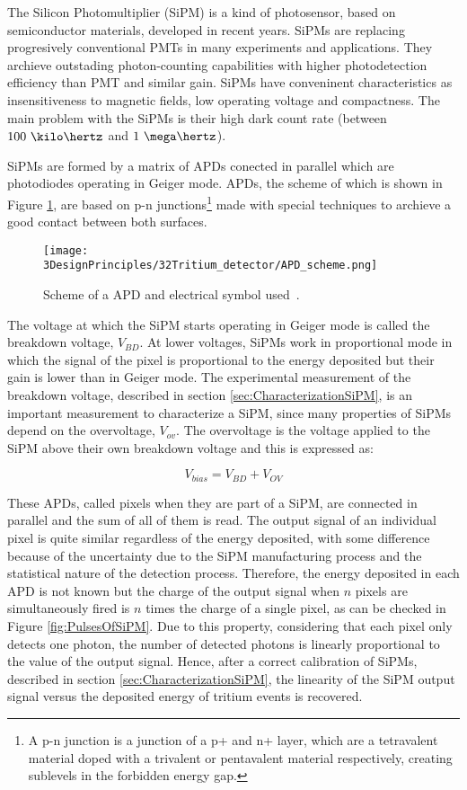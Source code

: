 The Silicon Photomultiplier (SiPM) is a kind of photosensor, based on semiconductor materials, developed in recent years. SiPMs are replacing progresively conventional PMTs in many experiments and applications. They archieve outstading photon-counting capabilities with higher photodetection efficiency than PMT and similar gain. SiPMs have conveninent characteristics as insensitiveness to magnetic fields, low operating voltage and compactness. The main problem with the SiPMs is their high dark count rate (between $100~\kilo\hertz$ and $1~\mega\hertz$).

SiPMs are formed by a matrix of APDs conected in parallel which are photodiodes operating in Geiger mode. APDs, the scheme of which is shown in Figure \ref{fig:SchemeAPD}, are based on p-n junctions\footnote{A p-n junction is a junction of a p+ and n+ layer, which are a tetravalent material doped with a trivalent or pentavalent material respectively, creating sublevels in the forbidden energy gap.} made with special techniques to archieve a good contact between both surfaces.

\begin{figure}[htbp]
\centering
\texttt{[image: 3DesignPrinciples/32Tritium\_detector/APD\_scheme.png]}
\caption{Scheme of a APD and electrical symbol used\label{fig:SchemeAPD}~\cite{OSI}.}
\end{figure}
 

The voltage at which the SiPM starts operating in Geiger mode is called the breakdown voltage, $V_ {BD}$. At lower voltages, SiPMs work in proportional mode in which the signal of the pixel is proportional to the energy deposited but their gain is lower than in Geiger mode. The experimental measurement of the breakdown voltage, described in section \ref{sec:CharacterizationSiPM}, is an important measurement to characterize a SiPM, since many properties of SiPMs depend on the overvoltage, $V_{ov}$. The overvoltage is the voltage applied to the SiPM above their own breakdown voltage and this is expressed as:

\begin{equation}
V_{bias}=V_{BD}+V_{OV}
\label{overvoltage}
\end{equation}

These APDs, called pixels when they are part of a SiPM, are connected in parallel and the sum of all of them is read. The output signal of an individual pixel is quite similar regardless of the energy deposited, with some difference because of the uncertainty due to the SiPM manufacturing process and the statistical nature of the detection process. Therefore, the energy deposited in each APD is not known but the charge of the output signal when $n$ pixels are simultaneously fired is $n$ times the charge of a single pixel, as can be checked in Figure \ref{fig:PulsesOfSiPM}. Due to this property, considering that each pixel only detects one photon, the number of detected photons is linearly proportional to the value of the output signal. Hence, after a correct calibration of SiPMs, described in section \ref{sec:CharacterizationSiPM}, the linearity of the SiPM output signal versus the deposited energy of tritium events is recovered.

